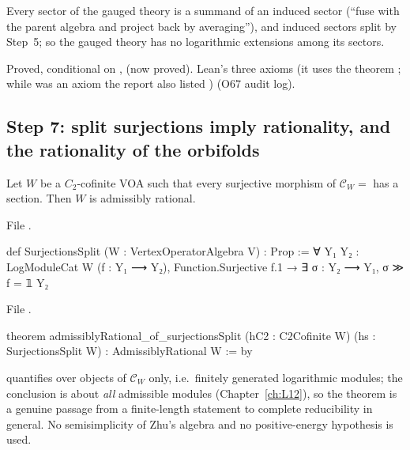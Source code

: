 \begin{physics}
Every sector of the gauged theory is a summand of an induced sector (``fuse with the parent algebra and project back by
averaging''), and induced sectors split by Step~5; so the gauged theory has no logarithmic extensions among its sectors.
\end{physics}

\begin{status}
Proved, conditional on ,  (now proved). Lean's three axioms (it uses the theorem ; while  was an axiom the report also listed ) (O67 audit log).
\end{status}

\subsection{Step 7: split surjections imply rationality, and the rationality of the orbifolds}

\begin{theorem}\label{l22:thm:O7}
Let $W$ be a $C_2$-cofinite VOA such that every surjective morphism of $\mathcal C_W=$  has a
section. Then $W$ is admissibly rational.
\end{theorem}
\noindent File .
\begin{leancode}
def SurjectionsSplit (W : VertexOperatorAlgebra V) : Prop :=
  ∀ {Y₁ Y₂ : LogModuleCat W} (f : Y₁ ⟶ Y₂), Function.Surjective f.1 →
    ∃ σ : Y₂ ⟶ Y₁, σ ≫ f = 𝟙 Y₂
\end{leancode}
\noindent File .
\begin{leancode}
theorem admissiblyRational_of_surjectionsSplit (hC2 : C2Cofinite W) (hs : SurjectionsSplit W) :
    AdmissiblyRational W := by
\end{leancode}

\begin{dictionary}
 quantifies over objects of $\mathcal C_W$ only, i.e.\ finitely generated logarithmic modules;
the conclusion  is about \emph{all} admissible modules (Chapter~\ref{ch:L12}), so the theorem
is a genuine passage from a finite-length statement to complete reducibility in general. No semisimplicity of Zhu's
algebra and no positive-energy hypothesis is used.
\end{dictionary}

